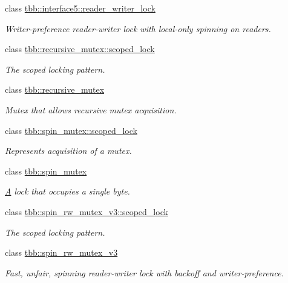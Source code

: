 \begin{DoxyCompactItemize}
class \hyperlink{classtbb_1_1interface5_1_1reader__writer__lock}{tbb\+::interface5\+::reader\+\_\+writer\+\_\+lock}
\begin{DoxyCompactList}\small\item\em Writer-\/preference reader-\/writer lock with local-\/only spinning on readers. \end{DoxyCompactList}\item 
class \hyperlink{classtbb_1_1recursive__mutex_1_1scoped__lock}{tbb\+::recursive\+\_\+mutex\+::scoped\+\_\+lock}
\begin{DoxyCompactList}\small\item\em The scoped locking pattern. \end{DoxyCompactList}\item 
class \hyperlink{classtbb_1_1recursive__mutex}{tbb\+::recursive\+\_\+mutex}
\begin{DoxyCompactList}\small\item\em Mutex that allows recursive mutex acquisition. \end{DoxyCompactList}\item 
class \hyperlink{classtbb_1_1spin__mutex_1_1scoped__lock}{tbb\+::spin\+\_\+mutex\+::scoped\+\_\+lock}
\begin{DoxyCompactList}\small\item\em Represents acquisition of a mutex. \end{DoxyCompactList}\item 
class \hyperlink{classtbb_1_1spin__mutex}{tbb\+::spin\+\_\+mutex}
\begin{DoxyCompactList}\small\item\em \hyperlink{structA}{A} lock that occupies a single byte. \end{DoxyCompactList}\item 
class \hyperlink{classtbb_1_1spin__rw__mutex__v3_1_1scoped__lock}{tbb\+::spin\+\_\+rw\+\_\+mutex\+\_\+v3\+::scoped\+\_\+lock}
\begin{DoxyCompactList}\small\item\em The scoped locking pattern. \end{DoxyCompactList}\item 
class \hyperlink{classtbb_1_1spin__rw__mutex__v3}{tbb\+::spin\+\_\+rw\+\_\+mutex\+\_\+v3}
\begin{DoxyCompactList}\small\item\em Fast, unfair, spinning reader-\/writer lock with backoff and writer-\/preference. \end{DoxyCompactList}\item 

\end{DoxyCompactItemize}
